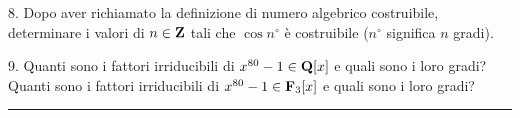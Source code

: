 \item{8.} Dopo aver richiamato la definizione di numero algebrico costruibile, determinare i valori di $n\in{\bf Z}$ tali che
$\cos n^{\circ}$ \`e costruibile ($n^{\circ}$ significa $n$ gradi).
\vv

\item{9.} 
 Quanti sono i fattori irriducibili di $x^{80}-1\in{\bf Q}[x]$ e quali sono i loro gradi?
 Quanti sono i fattori irriducibili di $x^{80}-1\in{\bf F}_3[x]$ e quali sono i loro gradi?
\ \vst

\vfill\vfill

\hrule\medskip

 \bye
